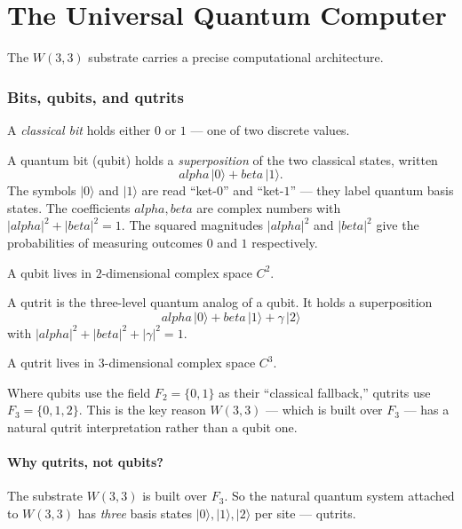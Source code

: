 \documentclass[11pt]{article}
\def\mathbb#1{#1}%
\def\textbf#1{#1}%
\def\alpha{alpha}%
\def\beta{beta}%
\begin{document}
\part{The Universal Quantum Computer}

The $W(3,3)$ substrate carries a precise computational architecture.

\section{Bits, qubits, and qutrits}

\begin{mathnote}
A \emph{classical bit} holds either $0$ or $1$ --- one of two discrete values.

A \textbf{quantum bit} (qubit) holds a \emph{superposition} of the two classical states, written
\[
\alpha\,|0\rangle + \beta\,|1\rangle.
\]
The symbols $|0\rangle$ and $|1\rangle$ are read ``ket-$0$'' and ``ket-$1$'' --- they label quantum basis states. The coefficients $\alpha, \beta$ are complex numbers with $|\alpha|^2 + |\beta|^2 = 1$. The squared magnitudes $|\alpha|^2$ and $|\beta|^2$ give the probabilities of measuring outcomes $0$ and $1$ respectively.

A qubit lives in $2$-dimensional complex space $\mathbb{C}^2$.
\end{mathnote}

\begin{mathnote}
A \textbf{qutrit} is the three-level quantum analog of a qubit. It holds a superposition
\[
\alpha\,|0\rangle + \beta\,|1\rangle + \gamma\,|2\rangle
\]
with $|\alpha|^2 + |\beta|^2 + |\gamma|^2 = 1$.

A qutrit lives in $3$-dimensional complex space $\mathbb{C}^3$.

Where qubits use the field $\mathbb{F}_2 = \{0, 1\}$ as their ``classical fallback,'' qutrits use $\mathbb{F}_3 = \{0, 1, 2\}$. This is the key reason $W(3,3)$ --- which is built over $\mathbb{F}_3$ --- has a natural qutrit interpretation rather than a qubit one.
\end{mathnote}

\subsection*{Why qutrits, not qubits?}

The substrate $W(3,3)$ is built over $\mathbb{F}_3$. So the natural quantum system attached to $W(3,3)$ has \emph{three} basis states $|0\rangle, |1\rangle, |2\rangle$ per site --- qutrits.
\end{document}
